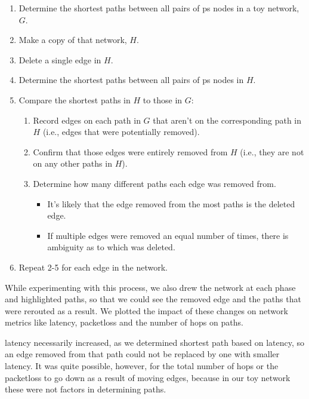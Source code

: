 \documentclass{finalreport}
\begin{document}
\begin{enumerate}
	\item Determine the shortest paths between all pairs of \gls{ps} nodes in a toy network, $G$.
	\item Make a copy of that network, $H$.
	\item Delete a single edge in $H$.
	\item Determine the shortest paths between all pairs of \gls{ps} nodes in $H$.
	\item Compare the shortest paths in $H$ to those in $G$:
	\begin{enumerate}
		\item Record edges on each path in $G$ that aren't on the corresponding path in $H$ (i.e., edges that were potentially removed).
		\item Confirm that those edges were entirely removed from $H$ (i.e., they are not on any other paths in $H$).
		\item Determine how many different paths each edge was removed from.
		\begin{itemize}
			\item It's likely that the edge removed from the most paths is the deleted edge.
			\item If multiple edges were removed an equal number of times, there is ambiguity as to which was deleted.
		\end{itemize}
	\end{enumerate}
	\item Repeat 2-5 for each edge in the network.
\end{enumerate}

While experimenting with this process, we also drew the network at each phase and highlighted paths, so that we could see the removed edge and the paths that were rerouted as a result. We plotted the impact of these changes on network metrics like \gls{latency}, \gls{packetloss} and the number of \glspl{hop} on paths. 

\Gls{latency} necessarily increased, as we determined shortest path based on latency, so an edge removed from that path could not be replaced by one with smaller latency. It was quite possible, however, for the total number of \glspl{hop} or the \gls{packetloss} to go down as a result of moving edges, because in our toy network these were not factors in determining paths.
\end{document}
